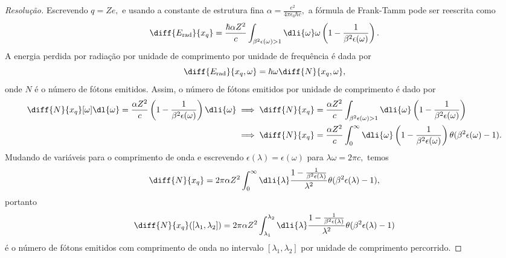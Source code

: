 \begin{proof}[Resolução]
    Escrevendo \(q = Ze,\) e usando a constante de estrutura fina \(\alpha = \frac{e^2}{4\pi \epsilon_0 \hbar c},\) a fórmula de Frank-Tamm pode ser reescrita como
    \begin{equation*}
        \diff{E_\mathrm{rad}}{x_q} = \frac{\hbar \alpha Z^2}{c} \int_{\beta^2 \epsilon(\omega) > 1} \dli{\omega}\omega\left(1 - \frac{1}{\beta^2 \epsilon(\omega)}\right).
    \end{equation*}
    A energia perdida por radiação por unidade de comprimento por unidade de frequência é dada por
    \begin{equation*}
        \diff{E_{\mathrm{rad}}}{x_q,\omega} = \hbar \omega \diff{N}{x_q,\omega},
    \end{equation*}
    onde \(N\) é o número de fótons emitidos. Assim, o número de fótons emitidos por unidade de comprimento é dado por
    \begin{align*}
        \diff{N}{x_q}[\omega]\dl{\omega} = \frac{\alpha Z^2}{c} \left(1 - \frac{1}{\beta^2 \epsilon(\omega)}\right) \dli{\omega} 
        &\implies \diff{N}{x_q} = \frac{\alpha Z^2}{c} \int_{\beta^2 \epsilon(\omega) > 1} \dli{\omega}\left(1 - \frac{1}{\beta^2 \epsilon(\omega)}\right)\\
        &\implies\diff{N}{x_q} = \frac{\alpha Z^2}{c} \int_{0}^{\infty} \dli{\omega}\left(1 - \frac{1}{\beta^2 \epsilon(\omega)}\right)\theta(\beta^2 \epsilon(\omega) - 1).
    \end{align*}
    Mudando de variáveis para o comprimento de onda e escrevendo \(\epsilon(\lambda) = \epsilon(\omega)\) para \(\lambda \omega = 2\pi c,\) temos
    \begin{equation*}
        \diff{N}{x_q} = 2\pi \alpha Z^2 \int_0^\infty \dli{\lambda} \frac{1 - \frac{1}{\beta^2 \epsilon(\lambda)}}{\lambda^2} \theta(\beta^2 \epsilon(\lambda) - 1),
    \end{equation*}
    portanto 
    \begin{equation*}
        \diff{N}{x_q}([\lambda_1, \lambda_2]) = 2\pi \alpha Z^2 \int_{\lambda_1}^{\lambda_2} \dli{\lambda} \frac{1 - \frac{1}{\beta^2 \epsilon(\lambda)}}{\lambda^2}\theta(\beta^2 \epsilon(\lambda) - 1)
    \end{equation*}
    é o número de fótons emitidos com comprimento de onda no intervalo \([\lambda_1, \lambda_2]\) por unidade de comprimento percorrido.
\end{proof}
